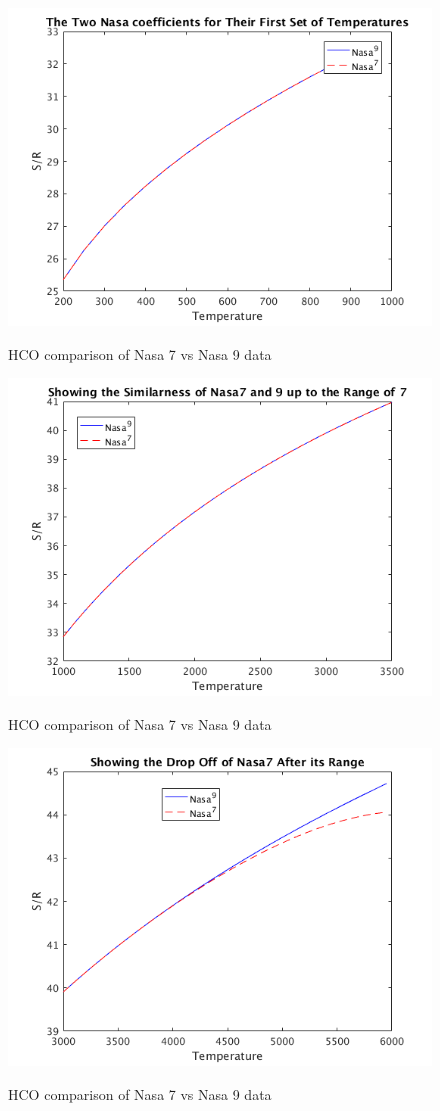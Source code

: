 \documentclass{article}
\begin{document}
\begin{figure}[!p]
  \centering
  \includegraphics[width=.8\linewidth]{./NasaPlots/S1.png}
  \label{fig:s1}
  \caption{HCO comparison of Nasa 7 vs Nasa 9 data}
\end{figure}


\begin{figure}[!p]
  \centering
  \includegraphics[width=.8\linewidth]{./NasaPlots/S2.png}
  \label{fig:S2}
  \caption{HCO comparison of Nasa 7 vs Nasa 9 data}
\end{figure}


\begin{figure}[!p]
  \centering
  \includegraphics[width=.8\linewidth]{./NasaPlots/S3.png}
  \label{fig:S3}
  \caption{HCO comparison of Nasa 7 vs Nasa 9 data}
\end{figure}
\end{document}
